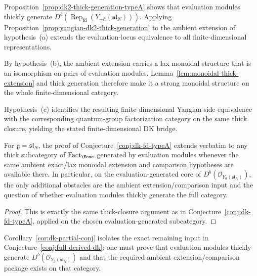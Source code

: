 \begin{remark}
Proposition~\ref{prop:dk2-thick-generation-typeA} shows that
evaluation modules thickly generate
$D^b(\operatorname{Rep}_{\mathrm{fd}}(Y_{\pm\hbar}(\mathfrak{sl}_N)))$.
Applying Proposition~\ref{prop:yangian-dk2-thick-generation} to the
ambient extension of hypothesis~\textup{(a)} extends the
evaluation-locus equivalence to all finite-dimensional
representations.

By hypothesis~\textup{(b)}, the ambient extension carries a lax
monoidal structure that is an isomorphism on pairs of evaluation
modules. Lemma~\ref{lem:monoidal-thick-extension} and thick generation
therefore make it a strong monoidal structure on the whole
finite-dimensional category.

Hypothesis~\textup{(c)} identifies the resulting finite-dimensional
Yangian-side equivalence with the corresponding quantum-group
factorization category on the same thick closure, yielding the stated
finite-dimensional DK bridge.
\end{remark}

\begin{corollary}\label{cor:dk-partial-conj}
For $\mathfrak{g}=\mathfrak{sl}_N$, the proof of
Conjecture~\ref{conj:dk-fd-typeA} extends verbatim to any thick
subcategory of $\operatorname{Fact}_{\Eone}$ generated by evaluation
modules whenever the same ambient exact/lax monoidal extension and
comparison hypotheses are available there. In particular, on the
evaluation-generated core of
$D^b(\mathcal{O}_{Y_\hbar(\mathfrak{sl}_N)})$, the only additional
obstacles are the ambient extension/comparison input and the question
of whether evaluation modules thickly generate the full category.
\end{corollary}

\begin{proof}
This is exactly the same thick-closure argument as in
Conjecture~\ref{conj:dk-fd-typeA}, applied on the chosen
evaluation-generated subcategory.
\end{proof}

\begin{remark}
\label{rem:dk-partial-conj-application}
Corollary~\ref{cor:dk-partial-conj} isolates the exact remaining
input in Conjecture~\ref{conj:full-derived-dk}: one must prove that
evaluation modules thickly generate
$D^b(\mathcal{O}_{Y_\hbar(\mathfrak{sl}_N)})$ and that the required
ambient extension/comparison package exists on that category.
\end{remark}


